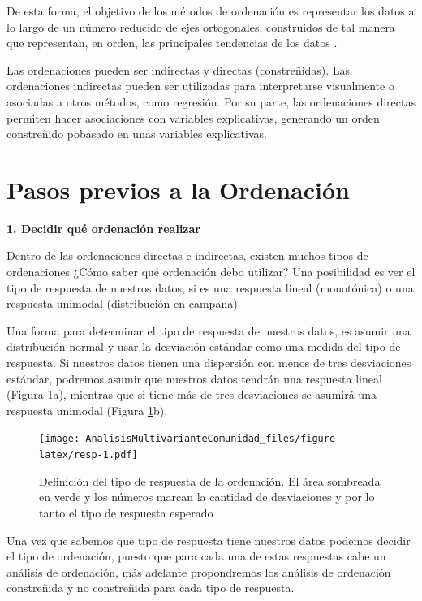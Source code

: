 \documentclass[]{book}
\begin{document}
De esta forma, el objetivo de los métodos de ordenación es representar
los datos a lo largo de un número reducido de ejes ortogonales,
construidos de tal manera que representan, en orden, las principales
tendencias de los datos \citep{Borcard2011}.

Las ordenaciones pueden ser indirectas y directas (constreñidas). Las
ordenaciones indirectas pueden ser utilizadas para interpretarse
visualmente o asociadas a otros métodos, como regresión. Por su parte,
las ordenaciones directas permiten hacer asociaciones con variables
explicativas, generando un orden constreñido pobasado en unas variables
explicativas.

\section{Pasos previos a la
Ordenación}\label{pasos-previos-a-la-ordenacion}

\textbf{1. Decidir qué ordenación realizar}

Dentro de las ordenaciones directas e indirectas, existen muchos tipos
de ordenaciones ¿Cómo saber qué ordenación debo utilizar? Una
posibilidad es ver el tipo de respuesta de nuestros datos, si es una
respuesta lineal (monotónica) o una respuesta unimodal (distribución en
campana).

Una forma para determinar el tipo de respuesta de nuestros datos, es
asumir una distribución normal y usar la desviación estándar como una
medida del tipo de respuesta. Si nuestros datos tienen una dispersión
con menos de tres desviaciones estándar, podremos asumir que nuestros
datos tendrán una respuesta lineal (Figura \ref{fig:resp}a), mientras
que si tiene más de tres desviaciones se asumirá una respuesta unimodal
(Figura \ref{fig:resp}b).

\begin{figure}[htbp]
\centering
\texttt{[image: AnalisisMultivarianteComunidad\_files/figure-latex/resp-1.pdf]}
\caption{\label{fig:resp}Definición del tipo de respuesta de la ordenación.
El área sombreada en verde y los números marcan la cantidad de
desviaciones y por lo tanto el tipo de respuesta esperado}
\end{figure}

Una vez que sabemos que tipo de respuesta tiene nuestros datos podemos
decidir el tipo de ordenación, puesto que para cada una de estas
respuestas cabe un análisis de ordenación, más adelante propondremos los
análisis de ordenación constreñida y no constreñida para cada tipo de
respuesta.
\end{document}
